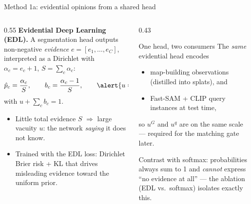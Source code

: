 \documentclass[aspectratio=169,10pt]{beamer}
\begin{document}
\begin{frame}{Method 1a: evidential opinions from a shared head}
  \begin{columns}[T]
    \begin{column}{0.55\textwidth}
      \textbf{Evidential Deep Learning (EDL).} A segmentation head outputs
      non-negative \emph{evidence} $e = [e_1, \dots, e_C]$, interpreted as a
      Dirichlet with $\alpha_c = e_c + 1$, $S = \sum_c \alpha_c$:
      \begin{equation*}
        \hat{p}_c = \frac{\alpha_c}{S}, \qquad
        b_c = \frac{\alpha_c - 1}{S}, \qquad
        \alert{u = \frac{C}{S}},
      \end{equation*}
      with $u + \sum_c b_c = 1$.
      \begin{itemize}
        \item Little total evidence $S$ $\Rightarrow$ large vacuity $u$:
              the network \emph{saying} it does not know.
        \item Trained with the EDL loss: Dirichlet Brier risk + KL that
              drives misleading evidence toward the uniform prior.
      \end{itemize}
    \end{column}
    \begin{column}{0.43\textwidth}
      \begin{block}{One head, two consumers}
        \small The \emph{same} evidential head encodes
        \begin{itemize}
          \item map-building observations (distilled into splats), and
          \item Fast-SAM + CLIP query instances at test time,
        \end{itemize}
        so $u^G$ and $u^q$ are on the same scale --- required for the
        matching gate later.
      \end{block}
      \vspace{2mm}
      \small Contrast with softmax: probabilities always sum to 1 and
      \emph{cannot} express ``no evidence at all'' --- the ablation
      (EDL vs.\ softmax) isolates exactly this.
    \end{column}
  \end{columns}
\end{frame}
\end{document}
